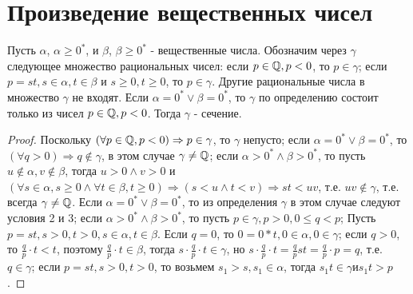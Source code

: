\documentclass[main]{subfiles}
\begin{document}
\section{Произведение вещественных чисел}
\begin{theorem}
    Пусть $\alpha$, $\alpha \geq 0^*$, и $\beta$, $\beta \geq 0^*$ - вещественные 
    числа. Обозначим через $\gamma$ следующее множество рациональных чисел:
    если $p \in \mathbb{Q}, p < 0$, то $p \in \gamma$; если $p = st, s \in \alpha, 
    t \in \beta$ и $s \geq 0, t \geq 0$, то $p \in \gamma$. Другие рациональные
    числа в множество $\gamma$ не входят. Если $\alpha = 0^* \vee \beta = 0^*$,
    то $\gamma$ по определению состоит только из чисел $p \in \mathbb{Q}, p < 0$. 
    Тогда $\gamma$ - сечение.  
\end{theorem}
\begin{proof}
    Поскольку $(\forall p \in \mathbb{Q}, p < 0) \Rightarrow p \in \gamma$, то $\gamma$
    непусто; если $\alpha = 0^* \vee \beta = 0^*$, то $(\forall q > 0) 
    \Rightarrow q \notin \gamma$, в этом случае $\gamma \neq \mathbb{Q}$; если 
    $\alpha > 0^* \wedge \beta > 0^*$, то пусть 
    $u \notin \alpha, v \notin \beta$, тогда $u > 0 \wedge v > 0$ и 
    $(\forall s \in \alpha, s \geq 0 \wedge \forall t \in \beta, t \geq 0) 
    \Rightarrow (s < u \wedge t < v) \Rightarrow st < uv$, т.е. 
    $uv \notin \gamma$, т.е. всегда $\gamma \neq \mathbb{Q}$.  
    Если $\alpha = 0^* \vee \beta = 0^*$, то из определения $\gamma$ в этом
    случае следуют условия 2 и 3; если $\alpha > 0^* \wedge \beta > 0^*$, то 
    пусть $p \in \gamma, p > 0, 0 \leq q < p$; Пусть $p = st, s > 0, t > 0, 
    s \in \alpha, t \in \beta$. Если $q = 0$, то $0 = 0 * t, 0 \in \alpha,
    0 \in \gamma$; если $q > 0$, то $\frac{q}{p} \cdot t < t$, поэтому
    $\frac{q}{p} \cdot t \in \beta$, тогда $s \cdot \frac{q}{p} \cdot t \in \gamma$,
    но $s \cdot \frac{q}{p} \cdot t = \frac{q}{p}st = \frac{q}{p} \cdot p = q$, т.е.
    $q \in \gamma$; если $p = st, s > 0, t > 0$, то возьмем $s_1 > s, s_1 \in 
    \alpha$, тогда $s_1t \in \gamma и s_1t > p$. 
\end{proof}
\end{document}
